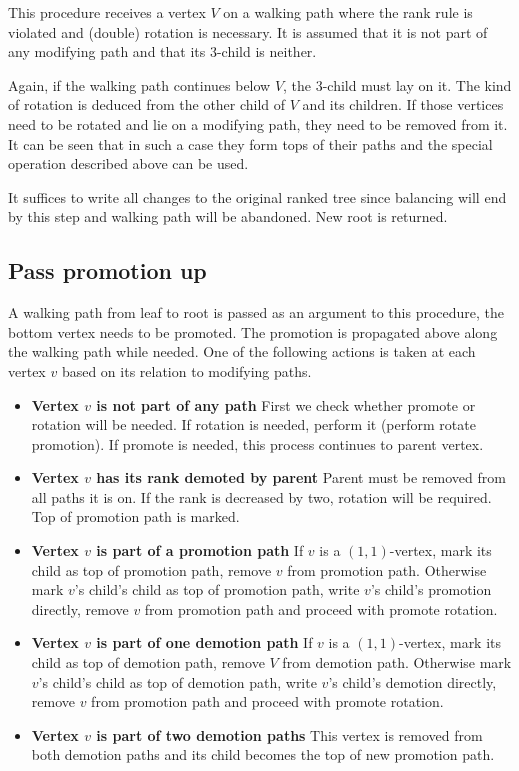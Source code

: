 This procedure receives a vertex $V$ on a walking path where the rank rule is violated and (double) rotation is necessary. It is assumed that it is not part of any modifying path and that its $3$-child is neither. 

Again, if the walking path continues below $V$, the 3-child must lay on it. The kind of rotation is deduced from the other child of $V$ and its children. If those vertices need to be rotated and lie on a modifying path, they need to be removed from it. It can be seen that in such a case they form tops of their paths and the special operation described above can be used.

It suffices to write all changes to the original ranked tree since balancing will end by this step and walking path will be abandoned. New root is returned.

\subsection{Pass promotion up}

A walking path from leaf to root is passed as an argument to this procedure, the bottom vertex needs to be promoted. The promotion is propagated above along the walking path while needed. One of the following actions is taken at each vertex $v$ based on its relation to modifying paths.

\begin{itemize}

\item {\bfseries Vertex $v$ is not part of any path} First we check whether promote or rotation will be needed. If rotation is needed, perform it (perform rotate promotion). If promote is needed, this process continues to parent vertex.

\item {\bfseries Vertex $v$ has its rank demoted by parent} Parent must be removed from all paths it is on. If the rank is decreased by two, rotation will be required. Top of promotion path is marked.

\item {\bfseries Vertex $v$ is part of a promotion path} If $v$ is a $(1,1)$-vertex, mark its child as top of promotion path, remove $v$ from promotion path. Otherwise mark $v$'s child's child as top of promotion path, write $v$'s child's promotion directly, remove $v$ from promotion path and proceed with promote rotation. 

\item {\bfseries Vertex $v$ is part of one demotion path} If $v$ is a $(1,1)$-vertex, mark its child as top of demotion path, remove $V$ from demotion path. Otherwise mark $v$'s child's child as top of demotion path, write $v$'s child's demotion directly, remove $v$ from promotion path and proceed with promote rotation.

\item {\bfseries Vertex $v$ is part of two demotion paths} This vertex is removed from both demotion paths and its child becomes the top of new promotion path.

\end{itemize}


